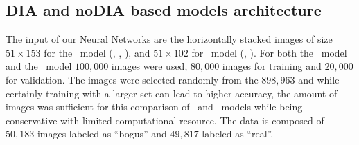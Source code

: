 \subsection{DIA and noDIA based models architecture}


The input of our Neural Networks are the horizontally stacked images of size $51 \times 153$ for the \diabased\ model (\diff, \search, \temp), and $51 \times 102$ for \nodia\ model (\search, \temp). For both the \diabased\ model and the \nodia\ model $100,000$ images were used, $80,000$ images for training  and $20,000$ for validation. The images were selected randomly from the $898,963$ and while certainly training with a larger set can lead to higher accuracy, the amount of images was sufficient for this comparison of \diabased\ and \nodia\ models while being conservative with limited computational resource. The data is composed of $50,183$ images labeled as ``bogus'' and $49,817$ labeled as ``real''. %


